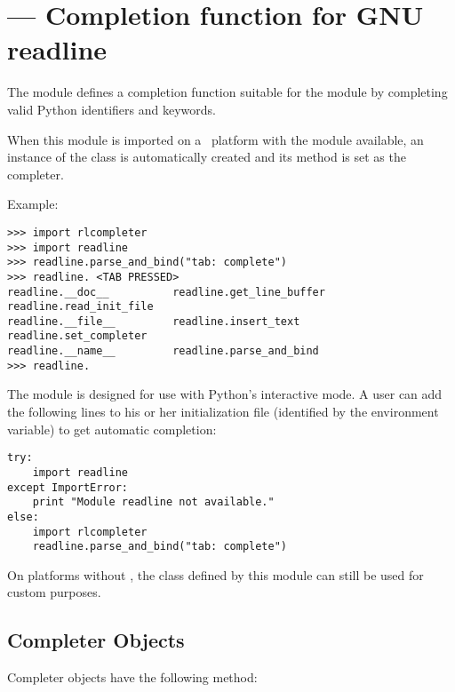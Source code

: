 \section{ ---
         Completion function for GNU readline}


The  module defines a completion function suitable for
the  module by completing valid Python identifiers
and keywords.

When this module is imported on a \UNIX\ platform with the 
module available, an instance of the  class is automatically
created and its  method is set as the 
completer.

Example:

\begin{verbatim}
>>> import rlcompleter
>>> import readline
>>> readline.parse_and_bind("tab: complete")
>>> readline. <TAB PRESSED>
readline.__doc__          readline.get_line_buffer  readline.read_init_file
readline.__file__         readline.insert_text      readline.set_completer
readline.__name__         readline.parse_and_bind
>>> readline.
\end{verbatim}

The  module is designed for use with Python's
interactive mode.  A user can add the following lines to his or her
initialization file (identified by the 
environment variable) to get automatic  completion:

\begin{verbatim}
try:
    import readline
except ImportError:
    print "Module readline not available."
else:
    import rlcompleter
    readline.parse_and_bind("tab: complete")
\end{verbatim}


On platforms without , the  class defined
by this module can still be used for custom purposes.

\subsection{Completer Objects \label{completer-objects}}

Completer objects have the following method:

